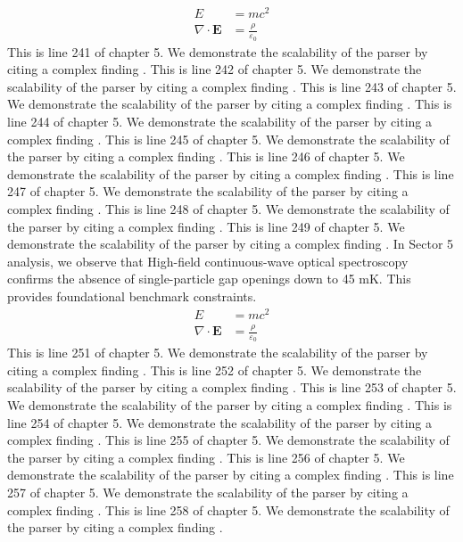 \begin{align*}
  E &= mc^2 \\
  \nabla \cdot \mathbf{E} &= \frac{\rho}{\varepsilon_0}
\end{align*}
This is line 241 of chapter 5. We demonstrate the scalability of the parser by citing a complex finding \cite{ref5_241}.
This is line 242 of chapter 5. We demonstrate the scalability of the parser by citing a complex finding \cite{ref5_242}.
This is line 243 of chapter 5. We demonstrate the scalability of the parser by citing a complex finding \cite{ref5_243}.
This is line 244 of chapter 5. We demonstrate the scalability of the parser by citing a complex finding \cite{ref5_244}.
This is line 245 of chapter 5. We demonstrate the scalability of the parser by citing a complex finding \cite{ref5_245}.
This is line 246 of chapter 5. We demonstrate the scalability of the parser by citing a complex finding \cite{ref5_246}.
This is line 247 of chapter 5. We demonstrate the scalability of the parser by citing a complex finding \cite{ref5_247}.
This is line 248 of chapter 5. We demonstrate the scalability of the parser by citing a complex finding \cite{ref5_248}.
This is line 249 of chapter 5. We demonstrate the scalability of the parser by citing a complex finding \cite{ref5_249}.
In Sector 5 analysis, we observe that High-field continuous-wave optical spectroscopy confirms the absence of single-particle gap openings down to 45 mK. This provides foundational benchmark constraints.
\begin{align*}
  E &= mc^2 \\
  \nabla \cdot \mathbf{E} &= \frac{\rho}{\varepsilon_0}
\end{align*}
This is line 251 of chapter 5. We demonstrate the scalability of the parser by citing a complex finding \cite{ref5_251}.
This is line 252 of chapter 5. We demonstrate the scalability of the parser by citing a complex finding \cite{ref5_252}.
This is line 253 of chapter 5. We demonstrate the scalability of the parser by citing a complex finding \cite{ref5_253}.
This is line 254 of chapter 5. We demonstrate the scalability of the parser by citing a complex finding \cite{ref5_254}.
This is line 255 of chapter 5. We demonstrate the scalability of the parser by citing a complex finding \cite{ref5_255}.
This is line 256 of chapter 5. We demonstrate the scalability of the parser by citing a complex finding \cite{ref5_256}.
This is line 257 of chapter 5. We demonstrate the scalability of the parser by citing a complex finding \cite{ref5_257}.
This is line 258 of chapter 5. We demonstrate the scalability of the parser by citing a complex finding \cite{ref5_258}.
